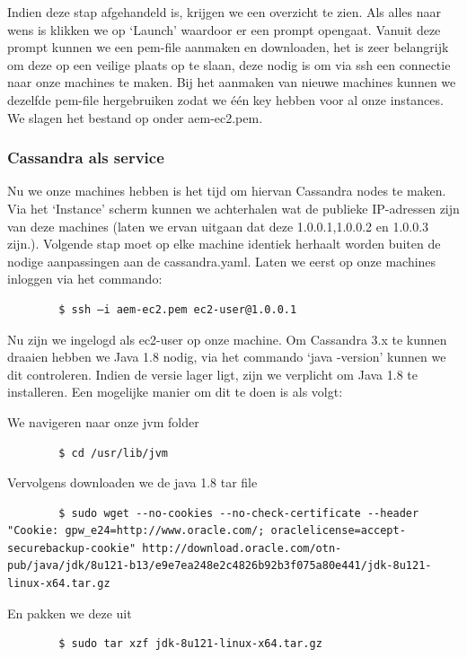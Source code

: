 \documentclass{article}
\begin{document}
	\par
	Indien deze stap afgehandeld is, krijgen we een overzicht te zien. 
	Als alles naar wens is klikken we op ‘Launch’ waardoor er een prompt opengaat. 
	Vanuit deze prompt kunnen we een pem-file aanmaken en downloaden, het is zeer belangrijk om 
	deze op een veilige plaats op te slaan, deze nodig is om via ssh een connectie naar onze machines te maken. 
	Bij het aanmaken van nieuwe machines kunnen we dezelfde pem-file hergebruiken zodat we één key hebben voor al onze instances.
	 We slagen het bestand op onder aem-ec2.pem.
	
	\subsubsection{Cassandra als service}
	Nu we onze machines hebben is het tijd om hiervan Cassandra nodes te maken. 
	Via het ‘Instance’ scherm kunnen we achterhalen wat de publieke IP-adressen zijn van deze machines 
	(laten we ervan uitgaan dat deze 1.0.0.1,1.0.0.2 en 1.0.0.3 zijn.). 
	Volgende stap moet op elke machine identiek herhaalt worden buiten de nodige aanpassingen aan de cassandra.yaml. 
	Laten we eerst op onze machines inloggen via het commando:
	
	\begin{lstlisting}
		$ ssh –i aem-ec2.pem ec2-user@1.0.0.1 
	\end{lstlisting}
	
	Nu zijn we ingelogd als ec2-user op onze machine. Om Cassandra 3.x te kunnen draaien hebben we Java 1.8 nodig, 
	via het commando ‘java -version’ kunnen we dit controleren. 
	Indien de versie lager ligt, zijn we verplicht om Java 1.8 te installeren. Een mogelijke manier om dit te doen is als volgt:	
	\par
	We navigeren naar onze jvm folder
	\begin{lstlisting}
  		$ cd /usr/lib/jvm
	\end{lstlisting}
	\par
	Vervolgens downloaden we de java 1.8 tar file
	\begin{lstlisting}
		$ sudo wget --no-cookies --no-check-certificate --header "Cookie: gpw_e24=http://www.oracle.com/; oraclelicense=accept-securebackup-cookie" http://download.oracle.com/otn-pub/java/jdk/8u121-b13/e9e7ea248e2c4826b92b3f075a80e441/jdk-8u121-linux-x64.tar.gz
	\end{lstlisting}
	
	\par
	En pakken we deze uit
	\begin{lstlisting}
		$ sudo tar xzf jdk-8u121-linux-x64.tar.gz
	\end{lstlisting}
	
\end{document}
